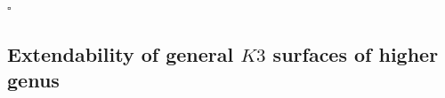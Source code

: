 \documentclass[11pt,twoside]{amsart}
\theoremstyle{plain}
\numberwithin{equation}{section}
\theoremstyle{definition}
\newcommand*{\QEDB}{\hfill\ensuremath{\square}}
\begin{document}

\QEDB

\subsection{Extendability of general $K3$ surfaces of higher genus}
\end{document}
